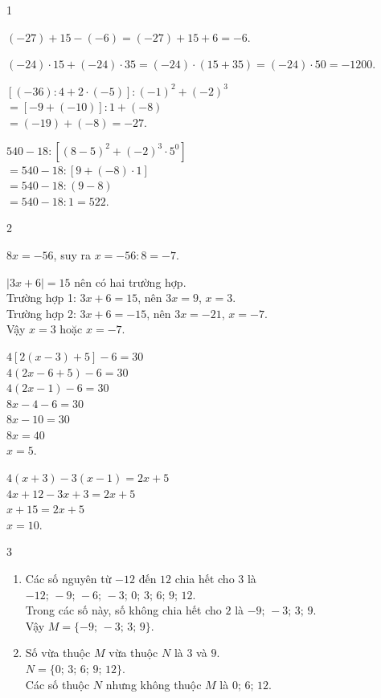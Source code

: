 \begin{Solbook}{1}
 \par \noindent  \begin {listEX} \item $(-27)+15-(-6)=(-27)+15+6= -6$. \item $(-24)\cdot 15+(-24)\cdot 35=(-24)\cdot (15+35)=(-24)\cdot 50=-1200$. \item $\left [(-36):4+2\cdot (-5)\right ]:(-1)^{2}+(-2)^{3}$\\ $=\left [-9+(-10)\right ]:1+(-8)$\\ $=(-19)+(-8)=-27$. \item $540-18:\left [(8-5)^{2}+(-2)^{3}\cdot 5^{0}\right ]$\\ $=540-18:\left [9+(-8)\cdot 1\right ]$\\ $=540-18:(9-8)$\\ $=540-18:1=522$. \end {listEX}  \hfill \qedEX 
\end{Solbook}
\begin{Solbook}{2}
 \par \noindent  \begin {listEX} \item $8x=-56$, suy ra $x=-56:8=-7$. \item $|3x+6|=15$ nên có hai trường hợp.\\ Trường hợp 1: $3x+6=15$, nên $3x=9$, $x=3$.\\ Trường hợp 2: $3x+6=-15$, nên $3x=-21$, $x=-7$.\\ Vậy $x=3$ hoặc $x=-7$. \item $4\left [2(x-3)+5\right ]-6=30$\\ $4(2x-6+5)-6=30$\\ $4(2x-1)-6=30$\\ $8x-4-6=30$\\ $8x-10=30$\\ $8x=40$\\ $x=5$. \item $4(x+3)-3(x-1)=2x+5$\\ $4x+12-3x+3=2x+5$\\ $x+15=2x+5$\\ $x=10$. \end {listEX}  \hfill \qedEX 
\end{Solbook}
\begin{Solbook}{3}
 \par \noindent  \begin {enumerate} \item Các số nguyên từ $-12$ đến $12$ chia hết cho $3$ là\\ $-12;\,-9;\,-6;\,-3;\,0;\,3;\,6;\,9;\,12$.\\ Trong các số này, số không chia hết cho $2$ là $-9;\,-3;\,3;\,9$.\\ Vậy $M=\{-9;\,-3;\,3;\,9\}$. \item Số vừa thuộc $M$ vừa thuộc $N$ là $3$ và $9$.\\ $N=\{0;\,3;\,6;\,9;\,12\}$.\\ Các số thuộc $N$ nhưng không thuộc $M$ là $0;\,6;\,12$. \end {enumerate}  \hfill \qedEX 
\end{Solbook}
